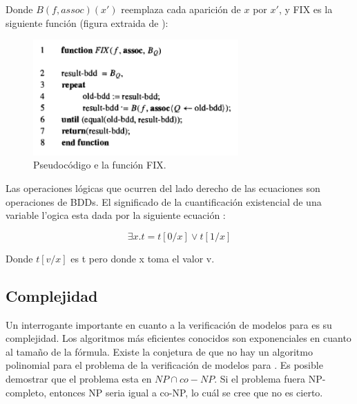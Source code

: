 \noindent Donde $B(f,assoc)(x')$ reemplaza cada aparición de $x$ por $x'$, y FIX es la siguiente función (figura extraida de \cite{Clarke:1}):
\begin{figure}[H]
  \centering
  \includegraphics[width=0.7\textwidth]{Figures/fix.png}
  \caption{Pseudocódigo e la función FIX.}
  \label{fig:fix}
\end{figure}

\noindent Las operaciones lógicas que ocurren del lado derecho de las ecuaciones son operaciones de BDDs. El significado de la cuantificación existencial de una variable l'ogica esta dada por la siguiente ecuación \cite{Andersen:7} :

\[ \exists x . t = t[0/x] \lor t[1/x]\] 

Donde $t[v/x]$ es t pero donde x toma el valor v.

\subsection{Complejidad}

Un interrogante importante en cuanto a la verificación de modelos para {\mucalculo} es su complejidad. Los algoritmos más eficientes conocidos son exponenciales en cuanto al tamaño de la fórmula. Existe la conjetura\cite{Clarke:1} de que no hay un algoritmo polinomial para el problema de la verificación de modelos para {\mucalculo}. Es posible demostrar que el problema esta en $NP \cap co-NP$. Si el problema fuera NP-completo, entonces NP seria igual a co-NP, lo cuál se cree que no es cierto.
